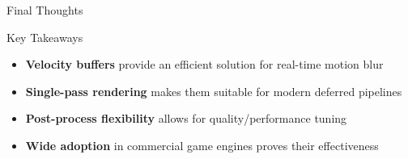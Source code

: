\documentclass[aspectratio=169]{beamer}
\begin{document}
\begin{frame}{Final Thoughts}
    \begin{block}{Key Takeaways}
        \begin{itemize}
            \item \textbf{Velocity buffers} provide an efficient solution for real-time motion blur
            \item \textbf{Single-pass rendering} makes them suitable for modern deferred pipelines
            \item \textbf{Post-process flexibility} allows for quality/performance tuning
            \item \textbf{Wide adoption} in commercial game engines proves their effectiveness
        \end{itemize}
    \end{block}
    
    \vspace{0.3cm}
    
    \begin{columns}[t]
        \begin{column}{0.48\textwidth}
        \end{column}
        

\end{columns}
\end{frame}
\end{document}
